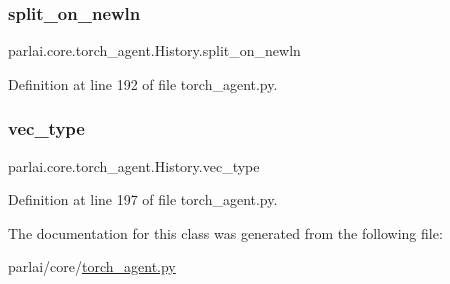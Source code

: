 \subsubsection{\texorpdfstring{split\+\_\+on\+\_\+newln}{split\_on\_newln}}
{\footnotesize\ttfamily parlai.\+core.\+torch\+\_\+agent.\+History.\+split\+\_\+on\+\_\+newln}



Definition at line 192 of file torch\+\_\+agent.\+py.

\mbox{\label{classparlai_1_1core_1_1torch__agent_1_1History_a7e5b6e0372fa48e0e1ba747b5628bfc7}} 
\subsubsection{\texorpdfstring{vec\+\_\+type}{vec\_type}}
{\footnotesize\ttfamily parlai.\+core.\+torch\+\_\+agent.\+History.\+vec\+\_\+type}



Definition at line 197 of file torch\+\_\+agent.\+py.



The documentation for this class was generated from the following file\+:\begin{DoxyCompactItemize}
\item 
parlai/core/\hyperlink{torch__agent_8py}{torch\+\_\+agent.\+py}\end{DoxyCompactItemize}
